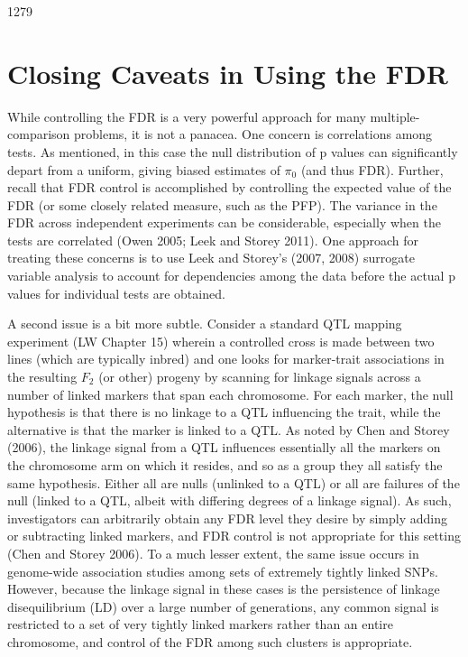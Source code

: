 \documentclass{article}
\begin{document}
1279

\section{Closing Caveats in Using the FDR}
While controlling the FDR is a very powerful approach for many multiple-comparison problems, it is not a panacea. One concern is correlations among tests. As mentioned, in this case the null distribution of p values can significantly depart from a uniform, giving biased estimates of  $ \pi_{0} $ (and thus FDR). Further, recall that FDR control is accomplished by controlling the expected value of the FDR (or some closely related measure, such as the PFP). The variance in the FDR across independent experiments can be considerable, especially when the tests are correlated (Owen 2005; Leek and Storey 2011). One approach for treating these concerns is to use Leek and Storey's (2007, 2008) surrogate variable analysis to account for dependencies among the data before the actual p values for individual tests are obtained.

A second issue is a bit more subtle. Consider a standard QTL mapping experiment (LW Chapter 15) wherein a controlled cross is made between two lines (which are typically inbred) and one looks for marker-trait associations in the resulting  $ F_{2} $ (or other) progeny by scanning for linkage signals across a number of linked markers that span each chromosome. For each marker, the null hypothesis is that there is no linkage to a QTL influencing the trait, while the alternative is that the marker is linked to a QTL. As noted by Chen and Storey (2006), the linkage signal from a QTL influences essentially all the markers on the chromosome arm on which it resides, and so as a group they all satisfy the same hypothesis. Either all are nulls (unlinked to a QTL) or all are failures of the null (linked to a QTL, albeit with differing degrees of a linkage signal). As such, investigators can arbitrarily obtain any FDR level they desire by simply adding or subtracting linked markers, and FDR control is not appropriate for this setting (Chen and Storey 2006). To a much lesser extent, the same issue occurs in genome-wide association studies among sets of extremely tightly linked SNPs. However, because the linkage signal in these cases is the persistence of linkage disequilibrium (LD) over a large number of generations, any common signal is restricted to a set of very tightly linked markers rather than an entire chromosome, and control of the FDR among such clusters is appropriate.
\end{document}
